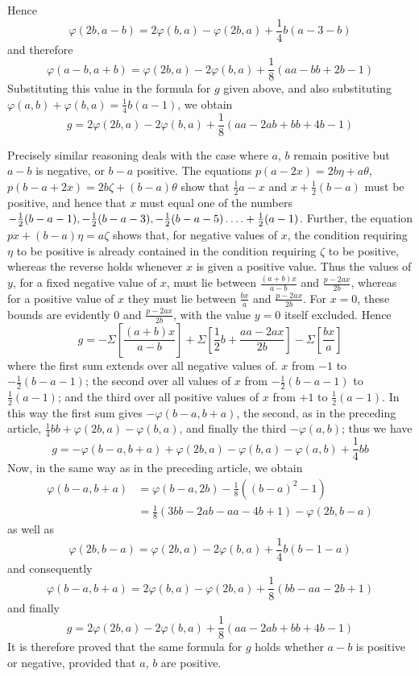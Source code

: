 %
Hence
\[
\varphi(2b,a-b)=2\varphi(b,a)-\varphi(2b,a)+\frac14b(a-3-b)
\]
and therefore
\[
\varphi(a-b,a+b)=\varphi(2b,a)-2\varphi(b,a)+\frac18(aa-bb+2b-1)
\]
Substituting this value in the formula for $g$ given above, and also substituting $\varphi(a,b)+\varphi(b,a)=\frac14b(a-1)$, we obtain
\[
g=2\varphi(2b,a)-2\varphi(b,a)+\frac18(aa-2ab+bb+4b-1)
\]

\newpage
{}
Precisely similar reasoning deals with the case where $a$, $b$ remain positive but $a-b$ is negative, or $b-a$ positive. The equations $p(a-2x)=2b\eta+a\theta$, $p(b-a+2x)=2b\zeta+(b-a)\theta$ show that $\frac12a-x$ and $x+\frac12(b-a)$ must be positive, and hence that $x$ must equal one of the numbers $-\frac12(b-a-1),-\frac12(b-a-3),-\frac12(b-a-5)\mathinner{.\,.\,.\,.}+\frac12(a-1)$. Further, the equation $px+(b-a)\eta=a\zeta$ shows that, for negative values of $x$, the condition requiring $\eta$ to be positive is already contained in the condition requiring $\zeta$ to be positive, whereas the reverse holds whenever $x$ is given a positive value. Thus the values of $y$, for a fixed negative value of $x$, must lie between $\frac{(a+b)x}{a-b}$ and $\frac{p-2ax}{2b}$, whereas for a positive value of $x$ they must lie between $\frac{bx}{a}$ and $\frac{p-2ax}{2b}$. For $x=0$, these bounds are evidently $0$ and $\frac{p-2ax}{2b}$, with the value $y=0$ itself excluded. Hence
\[
g=-\Sigma\left[\frac{(a+b)x}{a-b}\right]+\Sigma\left[\frac12b+\frac{aa-2ax}{2b}\right]-\Sigma\left[\frac{bx}{a}\right]
\]
where the first sum extends over all negative values of. $x$ from $-1$ to $-\frac12(b-a-1)$; the second over all values of $x$ from $-\frac12(b-a-1)$ to $\frac12(a-1)$; and the third over all positive values of $x$ from $+1$ to $\frac12(a-1)$. In this way the first sum gives $-\varphi(b-a,b+a)$, the second, as in the preceding article, $\frac14bb+\varphi(2b,a)-\varphi(b,a)$, and finally the third $-\varphi(a,b)$; thus we have
\[
g=-\varphi(b-a,b+a)+\varphi(2b,a)-\varphi(b,a)-\varphi(a,b)+\frac14bb
\]
Now, in the same way as in the preceding article, we obtain
%
\[
\begin{aligned}
\varphi(b-a,b+a)&=\varphi(b-a,2b)-\frac18((b-a)^2-1)\\
&=\frac18(3bb-2ab-aa-4b+1)-\varphi(2b,b-a)
\end{aligned}
\]
as well as
\[
\varphi(2b,b-a)=\varphi(2b,a)-2\varphi(b,a)+\frac14b(b-1-a)
\]
and consequently
\[
\varphi(b-a,b+a)=2\varphi(b,a)-\varphi(2b,a)+\frac18(bb-aa-2b+1)
\]
and finally
\[
g=2\varphi(2b,a)-2\varphi(b,a)+\frac18(aa-2ab+bb+4b-1)
\]
It is therefore proved that the same formula for $g$ holds whether $a-b$ is positive or negative, provided that $a$, $b$ are positive.

